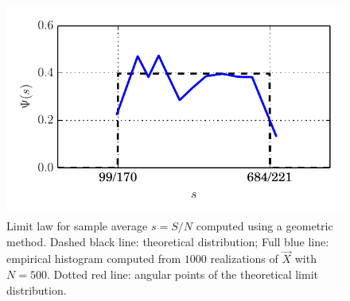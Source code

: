 \documentclass{article}
\begin{document}
\begin{figure}
\centerline{ \includegraphics[width=0.7\columnwidth]{Figs/LLN} }
\caption{ \label{fig:lln} Limit law for sample average $s=S/N$ computed using a geometric method.
Dashed black line: theoretical distribution; Full blue line:
empirical histogram computed from $1000$ realizations of $\vec X$ with $N=500$.
Dotted red line: angular points of the theoretical limit distribution. 
}
\end{figure}
\end{document}
